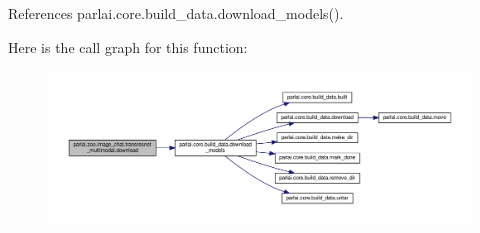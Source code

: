 References parlai.\+core.\+build\+\_\+data.\+download\+\_\+models().

Here is the call graph for this function\+:
\nopagebreak
\begin{figure}[H]
\begin{center}
\leavevmode
\includegraphics[width=350pt]{namespaceparlai_1_1zoo_1_1image__chat_1_1transresnet__multimodal_a07b4f0a9e7658b5b5599d6d71bc08f2a_cgraph}
\end{center}
\end{figure}

